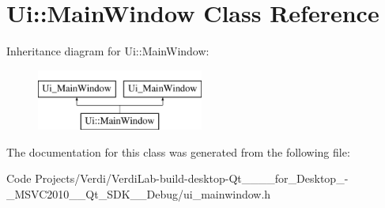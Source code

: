 \hypertarget{class_ui_1_1_main_window}{\section{\-Ui\-:\-:\-Main\-Window \-Class \-Reference}
\label{class_ui_1_1_main_window}
}
\-Inheritance diagram for \-Ui\-:\-:\-Main\-Window\-:\begin{figure}[H]
\begin{center}
\leavevmode
\includegraphics[height=2.000000cm]{class_ui_1_1_main_window}
\end{center}
\end{figure}


\-The documentation for this class was generated from the following file\-:\begin{DoxyCompactItemize}
\item 
\-Code Projects/\-Verdi/\-Verdi\-Lab-\/build-\/desktop-\/\-Qt\-\_\-\_\-\_\-\_\-for\-\_\-\-Desktop\-\_\--\/\-\_\-\-M\-S\-V\-C2010\-\_\-\-\_\-\-Qt\-\_\-\-S\-D\-K\-\_\-\-\_\-\-Debug/ui\-\_\-mainwindow.\-h\end{DoxyCompactItemize}
